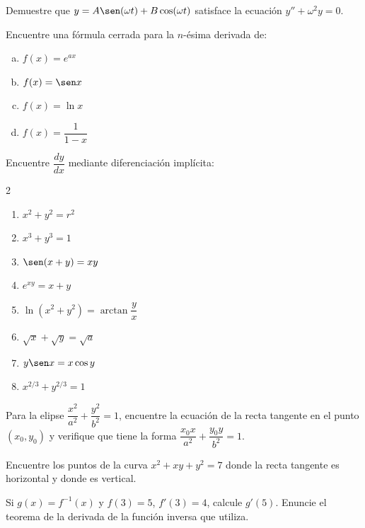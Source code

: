 \begin{prob}
Demuestre que $y = A\sen(\omega t) + B\cos(\omega t)$ satisface la ecuación
$y'' + \omega^2 y = 0$.
\end{prob}

\begin{prob}
Encuentre una fórmula cerrada para la $n$-ésima derivada de:
\begin{enumerate}[a)]
    \item $f(x) = e^{ax}$
    \item $f(x) = \sen x$
    \item $f(x) = \ln x$
    \item $f(x) = \dfrac{1}{1-x}$
\end{enumerate}
\end{prob}

\begin{prob}
Encuentre $\dfrac{dy}{dx}$ mediante diferenciación implícita:
\begin{multicols}{2}
\begin{enumerate}
    \item $x^2+y^2 = r^2$
    \item $x^3+y^3 = 1$
    \item $\sen(x+y) = xy$
    \item $e^{xy} = x+y$
    \item $\ln(x^2+y^2) = \arctan\!\dfrac{y}{x}$
    \item $\sqrt{x}+\sqrt{y} = \sqrt{a}$
    \item $y\sen x = x\cos y$
    \item $x^{2/3}+y^{2/3} = 1$
\end{enumerate}
\end{multicols}
\end{prob}

\begin{prob}
Para la elipse $\dfrac{x^2}{a^2}+\dfrac{y^2}{b^2}=1$, encuentre la
ecuación de la recta tangente en el punto $(x_0, y_0)$ y verifique que
tiene la forma $\dfrac{x_0 x}{a^2}+\dfrac{y_0 y}{b^2}=1$.
\end{prob}

\begin{prob}
Encuentre los puntos de la curva $x^2+xy+y^2=7$ donde la recta tangente
es horizontal y donde es vertical.
\end{prob}

\begin{prob}
Si $g(x) = f^{-1}(x)$ y $f(3)=5$, $f'(3)=4$, calcule $g'(5)$.
Enuncie el teorema de la derivada de la función inversa que utiliza.
\end{prob}

